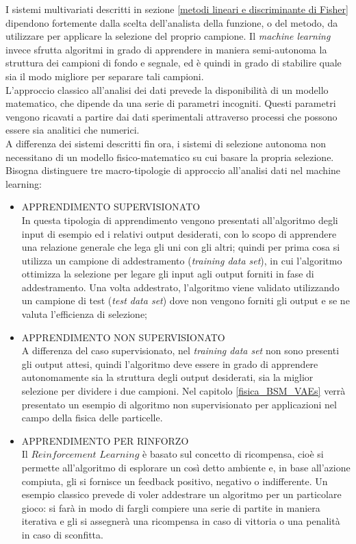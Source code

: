 I sistemi multivariati descritti in sezione \ref{metodi lineari e discriminante di Fisher} dipendono fortemente dalla scelta dell'analista della funzione, o del metodo, da utilizzare per applicare la selezione del proprio campione. Il \textit{machine learning} invece sfrutta algoritmi in grado di apprendere in maniera semi-autonoma la struttura dei campioni di fondo e segnale, ed è quindi in grado di stabilire quale sia il modo migliore per separare tali campioni. \\
L'approccio classico all'analisi dei dati prevede la disponibilità di un modello matematico, che dipende da una serie di parametri incogniti. Questi parametri vengono ricavati a partire dai dati sperimentali attraverso processi che possono essere sia analitici che numerici. \\
A differenza dei sistemi descritti fin ora, i sistemi di selezione autonoma non necessitano di un modello fisico-matematico su cui basare la propria selezione. \\
Bisogna distinguere tre macro-tipologie di approccio all'analisi dati nel machine learning:
\begin{itemize}
	
	\item APPRENDIMENTO SUPERVISIONATO \\
	In questa tipologia di apprendimento vengono presentati all'algoritmo degli input di esempio ed i relativi output desiderati, con lo scopo di apprendere una relazione generale che lega gli uni con gli altri; quindi per prima cosa si utilizza un campione di addestramento (\textit{training data set}), in cui l'algoritmo ottimizza la selezione per legare gli input agli output forniti in fase di addestramento. Una volta addestrato, l'algoritmo viene validato utilizzando un campione di test (\textit{test data set}) dove non vengono forniti gli output e se ne valuta l'efficienza di selezione;
	
	\item APPRENDIMENTO NON SUPERVISIONATO \\
	A differenza del caso supervisionato, nel \textit{training data set} non sono presenti gli output attesi, quindi l'algoritmo deve essere in grado di apprendere autonomamente sia la struttura degli output desiderati, sia la miglior selezione per dividere i due campioni.
	Nel capitolo \ref{fisica_BSM_VAEs} verrà presentato un esempio di algoritmo non supervisionato per applicazioni nel campo della fisica delle particelle.
	
	\item APPRENDIMENTO PER RINFORZO \\
	Il $\textit{Reinforcement Learning}$ è basato sul concetto di ricompensa, cioè si permette all'algoritmo di esplorare un così detto ambiente e, in base all'azione compiuta, gli si fornisce un feedback positivo, negativo o indifferente. Un esempio classico prevede di voler addestrare un algoritmo per un particolare gioco: si farà in modo di fargli compiere una serie di partite in maniera iterativa e gli si assegnerà una ricompensa in caso di vittoria o una penalità in caso di sconfitta. \\ 
\end{itemize}

